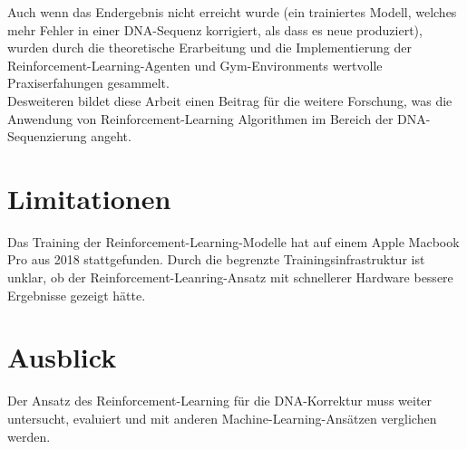 \documentclass[oneside,bibliography=totocnumbered,BCOR=5mm]{scrbook}%
\theoremstyle{definition}
\theoremstyle{definition}
\theoremstyle{definition}
\theoremstyle{definition}
\theoremstyle{definition}
\theoremstyle{definition}
\begin{document}
Auch wenn das Endergebnis nicht erreicht wurde (ein trainiertes Modell, welches mehr Fehler in einer DNA-Sequenz
korrigiert, als dass es neue produziert), wurden durch die theoretische Erarbeitung und
die Implementierung der Reinforcement-Learning-Agenten und Gym-Environments wertvolle Praxiserfahungen
gesammelt. \\

Desweiteren bildet diese Arbeit einen Beitrag für die weitere Forschung, was die Anwendung
von Reinforcement-Learning Algorithmen im Bereich der DNA-Sequenzierung angeht. \\

\section{Limitationen}
Das Training der Reinforcement-Learning-Modelle hat auf einem Apple Macbook Pro aus 2018 stattgefunden. 
Durch die begrenzte Trainingsinfrastruktur ist unklar, ob der Reinforcement-Leanring-Ansatz
mit schnellerer Hardware bessere Ergebnisse gezeigt hätte.

\section{Ausblick}
Der Ansatz des Reinforcement-Learning für die DNA-Korrektur muss weiter untersucht, evaluiert und
mit anderen Machine-Learning-Ansätzen verglichen werden.







\printbibliography[
heading=bibintoc,
title={Bibliography}
]


\newpage

\end{document}
